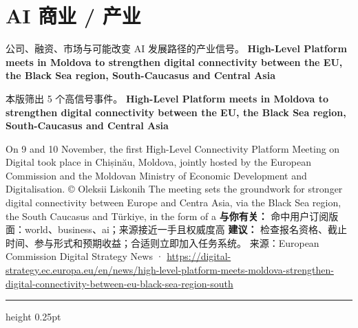 \documentclass[10.5pt]{ctexart}
\begin{document}
\section*{AI 商业 / 产业}
{\color{ormuted} 公司、融资、市场与可能改变 AI 发展路径的产业信号。}
\vspace{2mm}
{\LARGE\bfseries High-Level Platform meets in Moldova to strengthen digital connectivity between the EU, the Black Sea region, South-Caucasus and Central Asia}\par
\vspace{1mm}
{\color{ormuted} 本版筛出 5 个高信号事件。}
\vspace{3mm}
{\Large\bfseries High-Level Platform meets in Moldova to strengthen digital connectivity between the EU, the Black Sea region, South-Caucasus and Central Asia}\par
On 9 and 10 November, the first High-Level Connectivity Platform Meeting on Digital took place in Chișinău, Moldova, jointly hosted by the European Commission and the Moldovan Ministry of Economic Development and Digitalisation. © Oleksii Liskonih The meeting sets the groundwork for stronger digital connectivity between Europe and Centra Asia, via the Black Sea region, the South Caucasus and Türkiye, in the form of a
\textbf{与你有关：} 命中用户订阅版面：world、business、ai；来源接近一手且权威度高
\textbf{建议：} 检查报名资格、截止时间、参与形式和预期收益；合适则立即加入任务系统。
{\footnotesize\color{ormuted} 来源：European Commission Digital Strategy News · \url{https://digital-strategy.ec.europa.eu/en/news/high-level-platform-meets-moldova-strengthen-digital-connectivity-between-eu-black-sea-region-south}}
\vspace{4mm}
\hrule height 0.25pt
\vspace{3mm}
\end{document}
